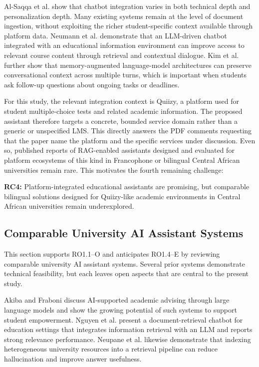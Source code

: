 \documentclass[a4paper,9pt,twocolumn]{extarticle}
\begin{document}
Al-Saqqa et al. \cite{alsaqqa2025} show that chatbot integration varies
in both technical depth and personalization depth. Many existing systems
remain at the level of document ingestion, without exploiting the richer
student-specific context available through platform data. Neumann et al.
\cite{neumann2025} demonstrate that an LLM-driven chatbot integrated with
an educational information environment can improve access to relevant
course content through retrieval and contextual dialogue. Kim et al.
\cite{kim2025} further show that memory-augmented language-model
architectures can preserve conversational context across multiple turns,
which is important when students ask follow-up questions about ongoing
tasks or deadlines.

For this study, the relevant integration context is Quiizy, a platform
used for student multiple-choice tests and related academic information.
The proposed assistant therefore targets a concrete, bounded service
domain rather than a generic or unspecified LMS. This directly answers
the PDF comments requesting that the paper name the platform and the
specific services under discussion. Even so, published reports of
RAG-enabled assistants designed and evaluated for platform ecosystems of
this kind in Francophone or bilingual Central African universities remain
rare. This motivates the fourth remaining challenge:

\textbf{RC4:} Platform-integrated educational assistants are promising,
but comparable bilingual solutions designed for Quiizy-like academic
environments in Central African universities remain underexplored.

\subsection{Comparable University AI Assistant Systems}
\label{sec:soa:systems}

This section supports RO1.1--O and anticipates RO1.4--E by reviewing
comparable university AI assistant systems. Several prior systems
demonstrate technical feasibility, but each leaves open aspects that are
central to the present study.

Akiba and Fraboni \cite{akiba2023} discuss AI-supported academic advising
through large language models and show the growing potential of such
systems to support student empowerment. Nguyen et al.
\cite{nguyen2024unibot} present a document-retrieval chatbot for
education settings that integrates information retrieval with an LLM and
reports strong relevance performance. Neupane et al.
\cite{neupane2024} likewise demonstrate that indexing heterogeneous
university resources into a retrieval pipeline can reduce hallucination
and improve answer usefulness.
\end{document}
